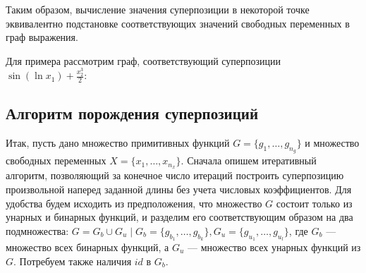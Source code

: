 \documentclass[12pt,a4paper]{amsart}
\begin{document}
Таким образом, вычисление значения суперпозиции в некоторой точке эквивалентно
подстановке соответствующих значений свободных переменных в граф выражения.

Для примера рассмотрим граф, соответствующий суперпозиции
$\sin (\ln x_1) + \frac{x_2^3}{2}$:


\subsection{Алгоритм порождения суперпозиций}

Итак, пусть дано множество примитивных функций $G = \{ g_1, \dots, g_{n_g} \}$ и
множество свободных переменных $X = \{ x_1, \dots, x_{n_x} \}$. Сначала
опишем итеративный алгоритм, позволяющий за конечное число итераций
построить суперпозицию произвольной наперед заданной длины без учета числовых
коэффициентов. Для удобства будем исходить из предположения, что множество
$G$ состоит только из унарных и бинарных функций, и разделим его
соответствующим образом на два подмножества:
$G = G_b \cup G_u \mid G_b = \{ g_{b_1}, \dots, g_{b_k} \}, G_u = \{ g_{u_1}, \dots, g_{u_l} \}$,
где $G_b$ --- множество всех бинарных функций, а $G_u$ --- множество всех
унарных функций из $G$. Потребуем также наличия $id$ в $G_b$.
\end{document}
